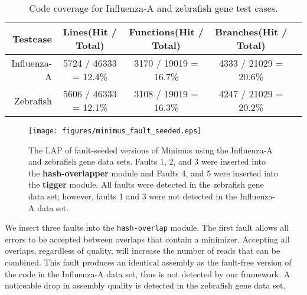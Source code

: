 \renewcommand{\baselinestretch}{1}
\small\normalsize


\begin{table*}[htbp]
\caption{Code coverage for Influenza-A and zebrafish gene test cases.}
\label{Tab:codecoverage}
\begin{center}
\begin{tabular}{r|cccc}
Testcase & Lines(Hit / Total) & Functions(Hit / Total) & Branches(Hit / Total)\\ \hline
Influenza-A & 5724 / 46333 = 12.4\% & 3170 / 19019 = 16.7\% & 4333 / 21029 = 20.6\% \\
Zebrafish & 5606 / 46333 = 12.1\%  & 3108 / 19019 = 16.3\% & 4247 / 21029 = 20.2\% \\
\hline
\end{tabular}
\end{center}
\end{table*}

\renewcommand{\baselinestretch}{2}
\small\normalsize

\begin{figure}[!htb]%
\begin{center}
  \texttt{[image: figures/minimus\_fault\_seeded.eps]}
\end{center}
\renewcommand{\baselinestretch}{1}
\small\normalsize
\begin{quote}
\caption[LAP scores for fault-seeded versions of Minimus]{The LAP of fault-seeded versions of Minimus using the Influenza-A and zebrafish gene data sets.  Faults 1, 2, and 3 were inserted into the \textbf{hash-overlapper} module and Faults 4, and 5 were inserted into the \textbf{tigger} module. All faults were detected in the zebrafish gene data set; however, faults 1 and 3 were not detected in the Influenza-A data set.}
\label{fig:minimus_fault_seeded}
\end{quote}
\end{figure}
\renewcommand{\baselinestretch}{2}
\small\normalsize

We insert three faults into the \texttt{hash-overlap} module.
The first fault allows all errors to be accepted between overlaps that contain a minimizer.
Accepting all overlaps, regardless of quality, will increase the number of reads that can be combined.
This fault produces an identical assembly as the fault-free version of the code in the Influenza-A data set, thus is not detected by our framework.
A noticeable drop in assembly quality is detected in the zebrafish gene data set.

